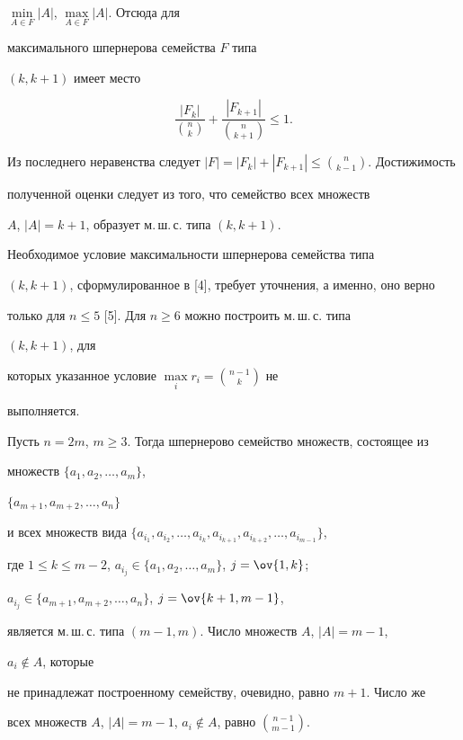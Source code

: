 $\min\limits_{A\in F}|A|$, $\max\limits_{A\in F}|A|$. Отсюда для 


максимального шпернерова семейства $F$ типа 


$(k,k+1)$ имеет место 


$$ 


\frac{|F_k|}{\binom{n}{k}}+\frac{|F_{k+1}|}{\binom{n}{k+1}}\le1. 


$$ 


Из последнего неравенства следует $|F|=|F_k|+|F_{k+1}|\le 


\binom{n}{k-1}$. Достижимость 


полученной оценки следует из того, что семейство всех множеств 


$A$, $|A|=k+1$, образует м.\,ш.\,с. типа $(k,k+1)$. 


 


Необходимое условие максимальности шпернерова семейства типа 


$(k,k+1)$, сформулированное в [4], требует уточнения, а именно, оно верно 


только для $n\le5$ [5]. Для $n\ge6$ можно построить м.\,ш.\,с. типа 


$(k,k+1)$, для 


которых указанное условие $\max\limits_i r_i=\binom{n-1}{k}$ не 


выполняется. 


 


Пусть $n=2m$, $m\ge3$. Тогда шпернерово семейство множеств, состоящее из 


множеств $\{a_1,a_2,\dotsc,a_m\}$,


$\{a_{m+1},a_{m+2},\dotsc,a_n\}$


и всех множеств вида $\{a_{i_1},a_{i_2},\dotsc,a_{i_k}, a_{i_{k+1}}, 


a_{i_{k+2}},\dotsc,a_{i_{m-1}}\}$, 


где $1\le k\le m-2$, $a_{i_j}\in\{a_1,a_2,\dotsc,a_m\}$, $j=\ov{1,k}$; 


$a_{i_j}\in\{a_{m+1},a_{m+2},\dotsc,a_n\}$, $j=\ov{k+1,m-1}$, 


является м.\,ш.\,с. типа $(m-1,m)$. Число множеств $A$, $|A|=m-1$, 


$a_i\notin A$, которые 


не принадлежат построенному семейству, очевидно, равно $m+1$. Число же 


всех множеств $A$, $|A|=m-1$, $a_i\notin A$, равно $\binom{n-1}{m-1}$. 


